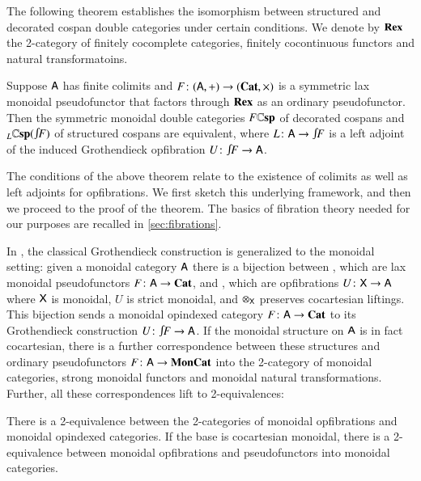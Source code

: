 \documentclass[reqno]{amsart}
\begin{document}
The following theorem establishes the isomorphism between structured and decorated cospan double categories under certain conditions.  We denote by $\mathbf{Rex}$ the 2-category of finitely cocomplete categories, finitely cocontinuous functors and natural transformatoins.

\begin{thm} \label{thm:equiv}
Suppose $\mathsf{A}$ has finite colimits and $F\colon(\mathsf{A},+) \to (\mathbf{Cat},\times)$ is a symmetric lax monoidal pseudofunctor that factors through $\mathbf{Rex}$ as an ordinary pseudofunctor. Then the symmetric monoidal double categories $F\mathbf{\mathbb Csp}$ of decorated cospans and $_L\lCsp(\inta F)$ of structured cospans are equivalent, where $L \maps \A \to \inta F$ is a left adjoint of the induced Grothendieck opfibration $U\maps \inta F \to \A$.
\end{thm}

The conditions of the above theorem relate to the existence of colimits as well as left adjoints for opfibrations. We first sketch this underlying framework, and then we proceed to the proof of the theorem. The basics of fibration theory needed for our purposes are recalled in \cref{sec:fibrations}. 

In \cite{MV}, the classical Grothendieck construction is generalized to the monoidal setting: given a monoidal category $\mathsf{A}$ there is a bijection between , which are lax monoidal pseudofunctors $F\colon\mathsf{A}\to\mathbf{Cat}$, and , which are opfibrations $U \colon \mathsf{X} \to \mathsf{A}$ where $\mathsf{X}$ is monoidal, $U$ is strict monoidal, and $\otimes_{\mathsf{X}}$ preserves cocartesian liftings.   This bijection sends a monoidal opindexed category $F \colon \mathsf{A} \to \mathbf{Cat}$ to its Grothendieck construction $U \maps \inta F \to \A$.  If the monoidal structure on $\mathsf{A}$ is in fact cocartesian, there is a further correspondence between these structures and ordinary pseudofunctors $F\colon\mathsf{A}\to\mathbf{MonCat}$ into the 2-category of monoidal categories, strong monoidal functors and monoidal natural transformations.   Further, all these correspondences lift to 2-equivalences:

\begin{lem}\label{lem:MonGroth}
 There is a 2-equivalence between the 2-categories of monoidal opfibrations and monoidal opindexed categories. If the base is cocartesian monoidal, there is a 2-equivalence between monoidal opfibrations and pseudofunctors into monoidal categories. 
\end{lem}
\end{document}
